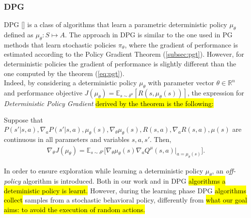 \subsubsection{\ac{DPG}} \label{subsec:dpg}
\acf{DPG} [\cite{article}] is a class of algorithms that learn a parametric deterministic policy $\mu_{\theta}$ defined as $\mu_{\theta}: S \mapsto A$. The approach in \ac{DPG} is similar to the one used in \ac{PG} methods that learn stochastic policies $\pi_{\theta}$, where the gradient of performance is estimated according to the Policy Gradient Theorem (\ref{subsec:pgt}). However, for deterministic policies the gradient of performance is slightly different than the one computed by the theorem (\ref{eq:pgt}).\\
\newline
Indeed, by considering a deterministic policy $\mu_{\theta}$ with parameter vector $\theta \in \mathbb{R}^n$ and performance objective $J(\mu_{\theta}) = \mathbb{E}_{s \sim \delta^{\mu}}[R(s, \mu_{\theta}(s))]$, the expression for \emph{Deterministic Policy Gradient} \hl{derived by the theorem is the following:}
\begin{theorem} \label{th:dpgt}
	Suppose that $P(s'|s,a), \nabla_aP(s'|s,a), \mu_{\theta}(s), \nabla_{\theta} \mu_{\theta}(s), R(s,a), \nabla_a R(s,a), \mu(s)$  are continuous in all parameters and variables $s, a, s'$. Then, 
	\begin{align}
	\nabla_{\theta}J(\mu_{\theta}) = \mathbb{E}_{s \sim \delta^{\mu}} \Big[\nabla_{\theta} \mu_{\theta} (s) \nabla_a Q^{\mu}(s,a)|_{a = \mu_{\theta} (s)}\Big].
	\end{align}
\end{theorem}
\noindent In order to ensure exploration while learning a deterministic policy $\mu_{\theta}$, an \emph{off-policy} algorithm is introduced. %
Both in our work and in \ac{DPG} \hl{algorithms a deteministic policy is learnt.} However, during the learning phase \ac{DPG} \hl{algorithms collect} samples from a stochastic behavioral policy, differently from \hl{what our goal aims: to avoid the execution of random actions.}\\
